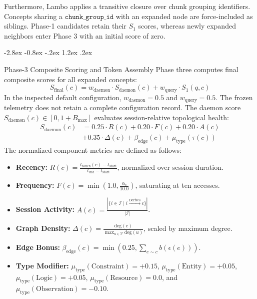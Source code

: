 \documentclass[10pt,twocolumn]{article}
\makeatletter
\renewcommand\subsection{\@startsection{subsection}{2}{\z@}%
  {-2.8ex \@plus -0.8ex \@minus -.2ex}%
  {1.2ex \@plus .2ex}%
  {\normalfont\normalsize\bfseries\raggedright}}
\makeatother
\begin{document}
Furthermore, Lambo applies a transitive closure over chunk grouping identifiers.
Concepts sharing a $\mathtt{chunk\_group\_id}$ with an expanded node are force-included as siblings.
Phase-1 candidates retain their $S_1$ scores, whereas newly expanded neighbors enter Phase 3 with an initial score of zero.

\subsection{Phase-3 Composite Scoring and Token Assembly}
Phase three computes final composite scores for all expanded concepts:
\begin{equation}
S_{\text{final}}(c) = w_{\text{daemon}} \cdot S_{\text{daemon}}(c) + w_{\text{query}} \cdot S_1(q, c)
\end{equation}
In the inspected default configuration, $w_{\text{daemon}} = 0.5$ and $w_{\text{query}} = 0.5$. The frozen telemetry does not retain a complete configuration record.
The daemon score $S_{\text{daemon}}(c) \in [0, 1 + B_{\max}]$ evaluates session-relative topological health:
\begin{align}
S_{\text{daemon}}(c) &= 0.25 \cdot R(c) + 0.20 \cdot F(c) + 0.20 \cdot A(c) \nonumber \\
&+ 0.35 \cdot \Delta(c) + \beta_{\text{edge}}(c) + \mu_{\text{type}}(\tau(c))
\end{align}
The normalized component metrics are defined as follows:
\begin{itemize}
    \item \textbf{Recency:} $R(c) = \frac{t_{\text{touch}}(c) - t_{\text{start}}}{t_{\text{end}} - t_{\text{start}}}$, normalized over session duration.
    \item \textbf{Frequency:} $F(c) = \min\left(1.0, \frac{\alpha_c}{10.0}\right)$, saturating at ten accesses.
    \item \textbf{Session Activity:} $A(c) = \frac{|\{i \in \mathcal{I} \mid i \xrightarrow{\text{Derives}} c\}|}{|\mathcal{I}|}$.
    \item \textbf{Graph Density:} $\Delta(c) = \frac{\text{deg}(c)}{\max_{u \in \mathcal{V}} \text{deg}(u)}$, scaled by maximum degree.
    \item \textbf{Edge Bonus:} $\beta_{\text{edge}}(c) = \min\left(0.25, \sum_{e \sim c} b(\epsilon(e))\right)$.
    \item \textbf{Type Modifier:} $\mu_{\text{type}}(\text{Constraint}) = +0.15$, $\mu_{\text{type}}(\text{Entity}) = +0.05$, $\mu_{\text{type}}(\text{Logic}) = +0.05$, $\mu_{\text{type}}(\text{Resource}) = 0.0$, and $\mu_{\text{type}}(\text{Observation}) = -0.10$.
\end{itemize}
\end{document}
